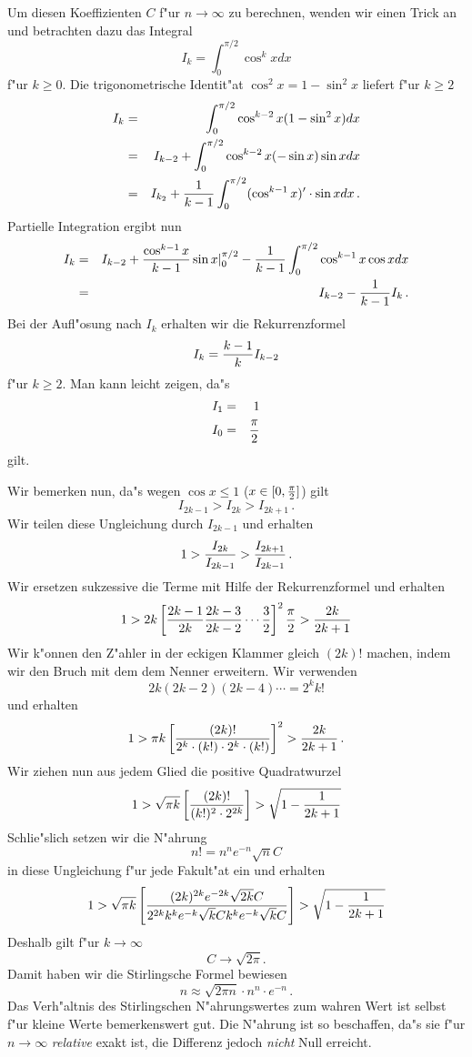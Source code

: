 \documentclass[10pt]{article}
\begin{document}
Um diesen Koeffizienten $C$ f"ur $n\rightarrow\infty$ zu berechnen,
wenden wir einen Trick an und betrachten dazu das Integral
$$ I_k = \int_0^{\pi/2} \cos^k x dx $$
f"ur $k\ge 0$. Die trigonometrische Identit"at $\cos^2 x = 1-\sin^2 x$ 
liefert f"ur $k\ge 2$
\begin{eqnarray*}
  I_k & = & \int_0^{\pi/2} \cos^{k-2} x (1-\sin^2 x) dx \\
      & = & I_{k-2} + \int_0^{\pi/2} \cos^{k-2} x (-\sin x) \sin x dx \\
      & = & I_{k_2} + 
            {1\over k-1} \int_0^{\pi/2} (\cos^{k-1} x)'\cdot\sin x dx \, .
\end{eqnarray*}
Partielle Integration ergibt nun
\begin{eqnarray*}
  I_k & = & I_{k-2} + {\cos^{k-1} x\over k-1} \sin x\vert_0^{\pi/2} -
            {1\over k-1} \int_0^{\pi/2} \cos^{k-1} x \cos x dx \\
      & = & I_{k-2} - {1\over k-1} I_k\,.
\end{eqnarray*}
Bei der Aufl"osung nach $I_k$ erhalten wir die Rekurrenzformel 
$$
  I_k = {k-1\over k} I_{k-2}
$$
f"ur $k\ge 2$. Man kann leicht zeigen, da"s
\begin{eqnarray*}
  I_1 & = & 1 \\
  I_0 & = & {\pi \over 2} 
\end{eqnarray*}
gilt.

Wir bemerken nun, da"s wegen $\cos x\le 1$ ($x\in [0,{\pi\over 2}]$) gilt
$$ I_{2k-1} > I_{2k} > I_{2k+1}\,. $$
Wir teilen diese Ungleichung durch $I_{2k-1}$ und erhalten 
$$ 1 > {I_{2k}\over I_{2k-1}} > {I_{2k+1}\over I_{2k-1}}\, . $$
Wir ersetzen sukzessive die Terme mit Hilfe der Rekurrenzformel und erhalten
$$ 1 > 2k \left[ {2k-1\over 2k} {2k-3\over 2k-2} \cdots {3\over 2}\right]^2
       {\pi\over 2}
     > {2k\over 2k+1}  $$
Wir k"onnen den Z"ahler in der eckigen Klammer gleich $(2k)!$ machen, indem
wir den Bruch mit dem dem Nenner erweitern. Wir verwenden
$$ 2k(2k-2)(2k-4)\cdots = 2^k k! $$
und erhalten
$$ 1 > \pi k \left[ {(2k)! \over 2^k\cdot (k!)\cdot 2^k\cdot (k!)} \right]^2 
     > {2k\over 2k+1} \, .$$
Wir ziehen nun aus jedem Glied die positive Quadratwurzel 
$$ 1 > \sqrt{\pi k}\left[{(2k)!\over (k!)^2\cdot 2^{2k}}\right]
     > \sqrt{1-{1\over 2k+1}} $$
Schlie"slich setzen wir die N"ahrung
$$ n! = n^n e^{-n} \sqrt{n} C $$
in diese Ungleichung f"ur jede Fakult"at ein und erhalten 
$$ 1 > \sqrt{\pi k}\left[{ (2k)^{2k} e^{-2k}\sqrt{2k} C\over
       2^{2k} k^k e^{-k} \sqrt{k} C k^k e^{-k} \sqrt{k} C} \right] 
     > \sqrt{1-{1\over 2k+1}} $$
Deshalb gilt f"ur $k\rightarrow\infty$
$$ C\rightarrow \sqrt{2\pi}. $$
Damit haben wir die Stirlingsche Formel bewiesen
$$
  n\approx\sqrt{2\pi n} \cdot n^n \cdot e^{-n} \, .
$$
Das Verh"altnis des Stirlingschen N"ahrungswertes zum wahren Wert ist selbst
f"ur kleine Werte bemerkenswert gut. Die N"ahrung ist so beschaffen, da"s sie
f"ur $n\rightarrow\infty$ \emph{relative} exakt ist, die Differenz jedoch 
\emph{nicht} Null erreicht.
\end{document}
